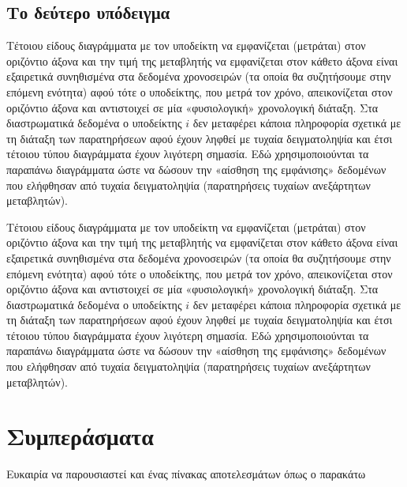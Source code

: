 \documentclass[12pt,a4paper,oneside]{book}
\begin{document}
\section{Το δεύτερο υπόδειγμα}
Τέτοιου είδους διαγράμματα με τον υποδείκτη να εμφανίζεται (μετράται) στον οριζόντιο άξονα και την τιμή της μεταβλητής να εμφανίζεται στον κάθετο άξονα είναι εξαιρετικά συνηθισμένα στα δεδομένα χρονοσειρών (τα οποία θα συζητήσουμε στην επόμενη ενότητα) αφού τότε ο υποδείκτης, που μετρά τον χρόνο, απεικονίζεται στον οριζόντιο άξονα και αντιστοιχεί σε μία «φυσιολογική» χρονολογική διάταξη. Στα διαστρωματικά δεδομένα ο υποδείκτης $i$ δεν μεταφέρει κάποια πληροφορία σχετικά με τη διάταξη των παρατηρήσεων αφού έχουν ληφθεί με τυχαία δειγματοληψία και έτσι τέτοιου τύπου διαγράμματα έχουν λιγότερη σημασία. Εδώ χρησιμοποιούνται τα παραπάνω διαγράμματα ώστε να δώσουν την «αίσθηση της εμφάνισης» δεδομένων που ελήφθησαν από τυχαία δειγματοληψία (παρατηρήσεις τυχαίων ανεξάρτητων μεταβλητών).

Τέτοιου είδους διαγράμματα με τον υποδείκτη να εμφανίζεται (μετράται) στον οριζόντιο άξονα και την τιμή της μεταβλητής να εμφανίζεται στον κάθετο άξονα είναι εξαιρετικά συνηθισμένα στα δεδομένα χρονοσειρών (τα οποία θα συζητήσουμε στην επόμενη ενότητα) αφού τότε ο υποδείκτης, που μετρά τον χρόνο, απεικονίζεται στον οριζόντιο άξονα και αντιστοιχεί σε μία «φυσιολογική» χρονολογική διάταξη. Στα διαστρωματικά δεδομένα ο υποδείκτης $i$ δεν μεταφέρει κάποια πληροφορία σχετικά με τη διάταξη των παρατηρήσεων αφού έχουν ληφθεί με τυχαία δειγματοληψία και έτσι τέτοιου τύπου διαγράμματα έχουν λιγότερη σημασία. Εδώ χρησιμοποιούνται τα παραπάνω διαγράμματα ώστε να δώσουν την «αίσθηση της εμφάνισης» δεδομένων που ελήφθησαν από τυχαία δειγματοληψία (παρατηρήσεις τυχαίων ανεξάρτητων μεταβλητών).

\newpage
\chapter{Συμπεράσματα}

Ευκαιρία να παρουσιαστεί και ένας πίνακας αποτελεσμάτων όπως ο παρακάτω
\end{document}
